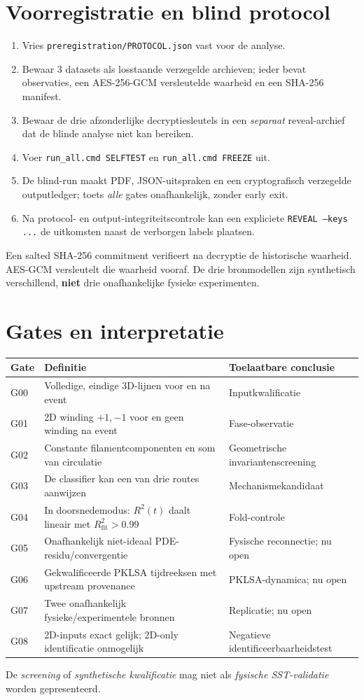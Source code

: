 \documentclass[11pt,a4paper]{article}
\begin{document}
\section{Voorregistratie en blind protocol}
\begin{enumerate}
\item Vries \texttt{preregistration/PROTOCOL.json} vast voor de analyse.
\item Bewaar 3 datasets als losstaande verzegelde archieven; ieder bevat
observaties, een AES-256-GCM versleutelde waarheid en een SHA-256 manifest.
\item Bewaar de drie afzonderlijke decryptiesleutels in een \emph{separaat}
reveal-archief dat de blinde analyse niet kan bereiken.
\item Voer \texttt{run\_all.cmd SELFTEST} en \texttt{run\_all.cmd FREEZE} uit.
\item De blind-run maakt PDF, JSON-uitspraken en een cryptografisch verzegelde
outputledger; toets \emph{alle} gates onafhankelijk, zonder early exit.
\item Na protocol- en output-integriteitscontrole kan een expliciete
\texttt{REVEAL --keys ...} de uitkomsten naast de verborgen labels plaatsen.
\end{enumerate}
Een salted SHA-256 commitment verifieert na decryptie de historische waarheid.
AES-GCM versleutelt die waarheid vooraf. De drie bronmodellen zijn synthetisch
verschillend, \textbf{niet} drie onafhankelijke fysieke experimenten.

\section{Gates en interpretatie}
\renewcommand{\arraystretch}{1.17}
\begin{longtable}{>{\raggedright\arraybackslash}p{}p{}p{}}
\toprule
Gate&Definitie&Toelaatbare conclusie\\\midrule
\endhead
G00&Volledige, eindige 3D-lijnen voor en na event&Inputkwalificatie\\
G01&2D winding $+1,-1$ voor en geen winding na event&Fase-observatie\\
G02&Constante filamentcomponenten en som van circulatie&Geometrische invariantenscreening\\
G03&De classifier kan een van drie routes aanwijzen&Mechanismekandidaat\\
G04&In doorsnedemodus: $R^2(t)$ daalt lineair met $R^2_{\mathrm{fit}}>0.99$&Fold-controle\\
G05&Onafhankelijk niet-ideaal PDE-residu/convergentie&Fysische reconnectie; nu open\\
G06&Gekwalificeerde PKLSA tijdreeksen met upstream provenance&PKLSA-dynamica; nu open\\
G07&Twee onafhankelijk fysieke/experimentele bronnen&Replicatie; nu open\\
G08&2D-inputs exact gelijk; 2D-only identificatie onmogelijk&Negatieve identificeerbaarheidstest\\
\bottomrule
\end{longtable}
De \emph{screening} of \emph{synthetische kwalificatie} mag niet als
\emph{fysische SST-validatie} worden gepresenteerd.
\end{document}
